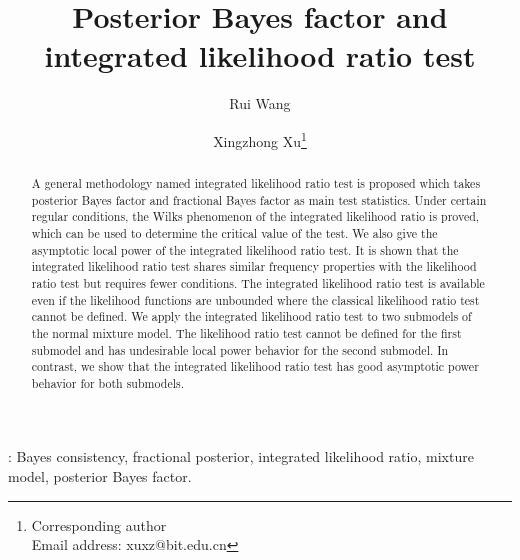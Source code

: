 \documentclass[11pt]{article}
\theoremstyle{plain}
\theoremstyle{definition}
\theoremstyle{remark}
\begin{document}
\title{Posterior Bayes factor and integrated likelihood ratio test}
\author[1]{Rui Wang}
\author[1,2]{Xingzhong Xu\thanks{Corresponding author\\Email address: xuxz@bit.edu.cn}}

\maketitle


\begin{abstract}
    A general methodology named integrated likelihood ratio test is proposed which takes posterior Bayes factor and fractional Bayes factor as main test statistics.
    Under certain regular conditions, the Wilks phenomenon of the integrated likelihood ratio is proved, which can be used to determine the critical value of the test.
    We also give the asymptotic local power of the integrated likelihood ratio test.
    It is shown that the integrated likelihood ratio test shares similar frequency properties with the likelihood ratio test but requires fewer conditions.
    The integrated likelihood ratio test is available even if the likelihood functions are unbounded where the classical likelihood ratio test cannot be defined.
    We apply the integrated likelihood ratio test to two submodels of the normal mixture model.
    The likelihood ratio test cannot be defined for the first submodel and has undesirable local power behavior for the second submodel.
    In contrast, we show that the integrated likelihood ratio test has good asymptotic power behavior for both submodels.
\end{abstract}

:
Bayes consistency,
fractional posterior,
integrated likelihood ratio,
mixture model,
posterior Bayes factor.
\end{document}
